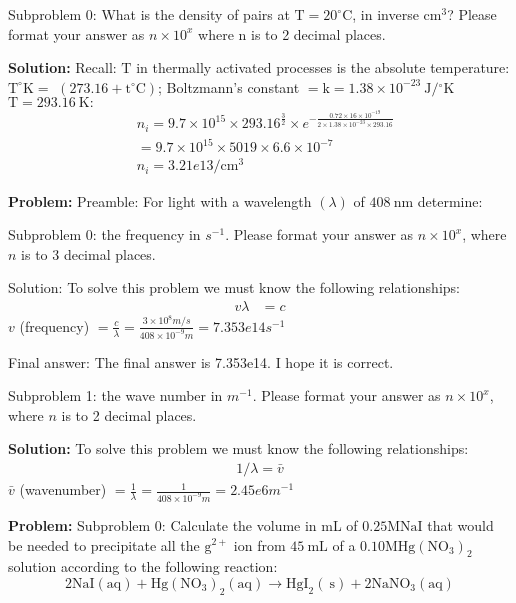 \documentclass[10pt]{article}
\begin{document}
Subproblem 0: What is the density of pairs at $\mathrm{T}=20^{\circ} \mathrm{C}$, in inverse $\mathrm{cm}^3$? Please format your answer as $n \times 10^x$ where n is to 2 decimal places.


\textbf{Solution:}
Recall: $\mathrm{T}$ in thermally activated processes is the absolute temperature: $\mathrm{T}^{\circ} \mathrm{K}=$ $\left(273.16+\mathrm{t}^{\circ} \mathrm{C}\right)$; Boltzmann's constant $=\mathrm{k}=1.38 \times 10^{-23} \mathrm{~J} /{ }^{\circ} \mathrm{K}$
$\mathrm{T}=293.16 \mathrm{~K}:$
\[
\begin{aligned}
&n_{i}=9.7 \times 10^{15} \times 293.16^{\frac{3}{2}} \times e^{-\frac{0.72 \times 16 \times 10^{-19}}{2 \times 1.38 \times 10^{-23} \times 293.16}} \\
&=9.7 \times 10^{15} \times 5019 \times 6.6 \times 10^{-7} \\
&n_{i}= \boxed{3.21e13} / \mathrm{cm}^{3}
\end{aligned}
\]


\textbf{Problem:}
Preamble: For light with a wavelength $(\lambda)$ of $408 \mathrm{~nm}$ determine:

Subproblem 0: the frequency in $s^{-1}$. Please format your answer as $n \times 10^x$, where $n$ is to 3 decimal places. 


Solution: To solve this problem we must know the following relationships:
\[
\begin{aligned}
v \lambda &=c
\end{aligned}
\]
$v$ (frequency) $=\frac{c}{\lambda}=\frac{3 \times 10^{8} m / s}{408 \times 10^{-9} m}= \boxed{7.353e14} s^{-1}$

Final answer: The final answer is 7.353e14. I hope it is correct.

Subproblem 1: the wave number in $m^{-1}$. Please format your answer as $n \times 10^x$, where $n$ is to 2 decimal places.


\textbf{Solution:}
To solve this problem we must know the following relationships:
\[
\begin{aligned}
1 / \lambda=\bar{v} 
\end{aligned}
\]
$\bar{v}$ (wavenumber) $=\frac{1}{\lambda}=\frac{1}{408 \times 10^{-9} m}=\boxed{2.45e6} m^{-1}$


\textbf{Problem:}
Subproblem 0: Calculate the volume in mL of $0.25 \mathrm{M} \mathrm{NaI}$ that would be needed to precipitate all the $\mathrm{g}^{2+}$ ion from $45 \mathrm{~mL}$ of a $0.10 \mathrm{M} \mathrm{Hg}\left(\mathrm{NO}_{3}\right)_{2}$ solution according to the following reaction:
\[
2 \mathrm{NaI}(\mathrm{aq})+\mathrm{Hg}\left(\mathrm{NO}_{3}\right)_{2}(\mathrm{aq}) \rightarrow \mathrm{HgI}_{2}(\mathrm{~s})+2 \mathrm{NaNO}_{3}(\mathrm{aq})
\]
\end{document}
